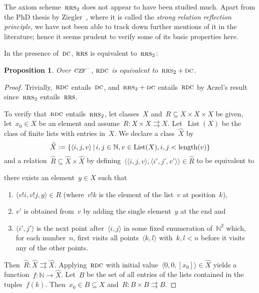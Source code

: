 \documentclass[oneside,reqno]{amsart}
\theoremstyle{definition}
\theoremstyle{plain}
\newtheorem{prop}[defn]{Proposition}
\theoremstyle{remark}
\newenvironment{indentblock}{%
  \list{}{\leftmargin\leftmargin}%
  \item\relax
}{%
  \endlist
}
\newcommand{\NN}{\mathbb{N}}
\newcommand{\defeq}{\vcentcolon=}
\DeclareMathOperator{\length}{length}
\DeclareMathOperator{\List}{List}
\renewcommand{\_}{\mathpunct{.}\,}
\newcommand{\?}{\,{:}\,}
\newcommand{\CZF}{\textsc{czf}}
\newcommand{\RRS}{\textsc{rrs}}
\newcommand{\RDC}{\textsc{rdc}}
\newcommand{\DC}{\textsc{dc}}
\begin{document}
The axiom scheme~$\RRS_2$ does not appear to have been studied much. Apart from
the PhD thesis by Ziegler~\cite{ziegler:phd}, where it is called the
\emph{strong relation reflection principle}, we have not been able to track
down further mentions of it in the literature; hence it seems prudent to verify
some of its basic properties here.

In the presence of~$\DC$, $\RRS$ is equivalent to~$\RRS_2$:

\begin{prop}\label{prop:rdc-rrs2-dc}
Over~$\CZF^-$, $\RDC$ is equivalent to~$\RRS_2 + \DC$.
\end{prop}

\begin{proof}Trivially,~$\RDC$ entails~$\DC$, and~$\RRS_2 + \DC$
entails~$\RDC$ by Aczel's result since~$\RRS_2$ entails~$\RRS$.

To verify that~$\RDC$ entails~$\RRS_2$, let classes~$X$ and~$R \subseteq X
\times X \times X$ be given, let~$x_0 \in X$ be an element and assume~$R : X
\times X \rightrightarrows X$. Let~$\List(X)$ be the class of finite lists with
entries in~$X$. We declare a class~$\widehat X$ by
\[ \widehat X \defeq \{ \langle i,j,v \rangle \,|\, i,j \in
\NN, v \in \List(X), i,j < \length(v) \} \]
and a relation~$\widehat R \subseteq \widehat X \times \widehat X$ by
defining~$\langle \langle i,j,v \rangle, \langle i',j',v' \rangle \rangle \in
\widehat R$ to be equivalent to
\begin{indentblock}
there exists an element~$y \in X$ such that
\begin{enumerate}
\item $\langle v!i, v!j, y \rangle \in R$ (where~$v!k$ is the element of the
list~$v$ at position~$k$),
\item $v'$ is obtained from~$v$ by adding the single element~$y$ at the end and
\item $\langle i',j' \rangle$ is the next point after~$\langle i,j
\rangle$ in some fixed enumeration of~$\NN^2$ which, for each number~$n$, first visits
all points~$\langle k,l \rangle$ with~$k,l < n$ before it visits any of
the other points.
\end{enumerate}
\end{indentblock}
Then~$\widehat R : \widehat X \rightrightarrows \widehat X$. Applying~$\RDC$
with initial value~$\langle 0,0, [x_0] \rangle \in \widehat X$ yields a
function~$f : \NN \to \widehat X$. Let~$B$ be the set of all
entries of the lists contained in the tuples~$f(k)$. Then~$x_0 \in B
\subseteq X$ and~$R : B \times B \rightrightarrows B$.
\end{proof}
\end{document}
